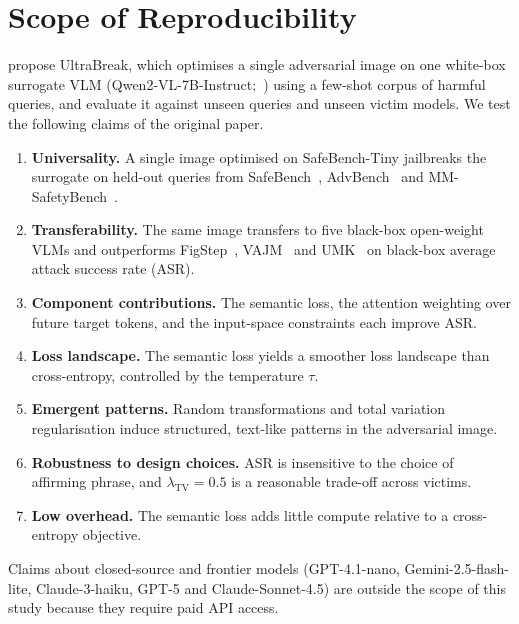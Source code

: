 \documentclass[10pt]{article} %
\begin{document}
\section{Scope of Reproducibility}
\label{sec:scope}

\citet{cui2026ultrabreak} propose UltraBreak, which optimises a single adversarial image on one white-box surrogate VLM (Qwen2-VL-7B-Instruct;~\citealp{wang2024qwen2vl}) using a few-shot corpus of harmful queries, and evaluate it against unseen queries and unseen victim models. We test the following claims of the original paper.

\begin{enumerate}
    \item \textbf{Universality.} A single image optimised on SafeBench-Tiny jailbreaks the surrogate on held-out queries from SafeBench~\citep{gong2025figstep}, AdvBench~\citep{zou2023universal} and MM-SafetyBench~\citep{liu2024mmsafetybench}.
    \label{claim:universal}
    \item \textbf{Transferability.} The same image transfers to five black-box open-weight VLMs and outperforms FigStep~\citep{gong2025figstep}, VAJM~\citep{qi2024visual} and UMK~\citep{wang2024umk} on black-box average attack success rate (ASR).
    \label{claim:transfer}
    \item \textbf{Component contributions.} The semantic loss, the attention weighting over future target tokens, and the input-space constraints each improve ASR.
    \label{claim:ablation}
    \item \textbf{Loss landscape.} The semantic loss yields a smoother loss landscape than cross-entropy, controlled by the temperature $\tau$.
    \label{claim:landscape}
    \item \textbf{Emergent patterns.} Random transformations and total variation regularisation induce structured, text-like patterns in the adversarial image.
    \label{claim:patterns}
    \item \textbf{Robustness to design choices.} ASR is insensitive to the choice of affirming phrase, and $\lambda_{\mathrm{TV}}=0.5$ is a reasonable trade-off across victims.
    \label{claim:sensitivity}
    \item \textbf{Low overhead.} The semantic loss adds little compute relative to a cross-entropy objective.
    \label{claim:overhead}
\end{enumerate}

Claims about closed-source and frontier models (GPT-4.1-nano, Gemini-2.5-flash-lite, Claude-3-haiku, GPT-5 and Claude-Sonnet-4.5) are outside the scope of this study because they require paid API access.
\end{document}
